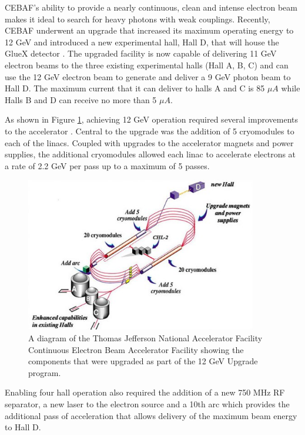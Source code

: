 CEBAF's ability to provide a nearly continuous, clean and intense electron
beam makes it ideal to search for heavy photons with weak couplings. Recently,
CEBAF underwent an upgrade that increased its maximum operating energy to 12
GeV and introduced a new experimental hall, Hall D, that will house the
GlueX detector \cite{Dudek:2012vr}.  The upgraded facility is now capable of 
delivering 11 GeV electron beams to the three existing experimental halls
(Hall A, B, C) and can use the 12 GeV electron beam to generate and deliver a 9
GeV photon beam to Hall D.  The maximum current that it can deliver to halls
A and C is 85 $\mu A$ while Halls B and D can receive no more than 5 $\mu A$.

As shown in Figure \ref{fig:cebaf}, achieving 12 GeV operation required several
improvements to the accelerator \cite{Burkert:2012rh}. Central to the upgrade 
was the addition of 5 
cryomodules to each of the linacs.  Coupled with upgrades to the accelerator
magnets and power supplies, the additional cryomodules allowed each linac to
accelerate electrons at a rate of 2.2 GeV per pass up to a maximum of 5 passes.
\begin{figure}[h]
    \centering
    \includegraphics[width=0.9\textwidth]{images/cebaf.jpg}
    \caption{A diagram of the Thomas Jefferson National Accelerator Facility
             Continuous Electron Beam Accelerator Facility showing the 
             components that were upgraded as part of the 12 GeV Upgrade 
             program.}
    \label{fig:cebaf}
\end{figure}
Enabling four hall operation also required the addition of a new 750 MHz RF 
separator, a new laser to the electron source and a 10th arc which provides
the additional pass of acceleration that allows 
delivery of the maximum beam energy to Hall D.


